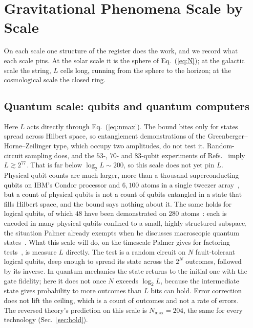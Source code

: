 \documentclass[aps,prd,twocolumn,superscriptaddress,nofootinbib,showkeys]{revtex4-2}
\begin{document}
\section{Gravitational Phenomena Scale by Scale}
\label{sec:scales}

On each scale one structure of the register does the work, and we record what each scale pins. At the solar scale it is the sphere of Eq.~(\ref{eq:N}); at the galactic scale the string, $L$ cells long, running from the sphere to the horizon; at the cosmological scale the closed ring.

\subsection{Quantum scale: qubits and quantum computers}

Here $L$ acts directly through Eq.~(\ref{eq:nmax}). The bound bites only for states spread across Hilbert space, so entanglement demonstrations of the Greenberger--Horne--Zeilinger type, which occupy two amplitudes, do not test it. Random-circuit sampling does, and the $53$-, $70$- and $83$-qubit experiments of Refs.~\cite{arute2019,morvan2024,gao2025} imply $L\gtrsim2^{77}$. That is far below $\log_2L\sim200$, so this scale does not yet pin $L$. Physical qubit counts are much larger, more than a thousand superconducting qubits on IBM's Condor processor and $6{,}100$ atoms in a single tweezer array~\cite{manetsch2025}, but a count of physical qubits is not a count of qubits entangled in a state that fills Hilbert space, and the bound says nothing about it. The same holds for logical qubits, of which $48$ have been demonstrated on $280$ atoms~\cite{bluvstein2024}: each is encoded in many physical qubits confined to a small, highly structured subspace, the situation Palmer already exempts when he discusses macroscopic quantum states~\cite{palmer2026}. What this scale will do, on the timescale Palmer gives for factoring tests~\cite{palmer2026,gidney2025}, is measure $L$ directly. The test is a random circuit on $N$ fault-tolerant logical qubits, deep enough to spread its state across the $2^N$ outcomes, followed by its inverse. In quantum mechanics the state returns to the initial one with the gate fidelity; here it does not once $N$ exceeds $\log_2L$, because the intermediate state gives probability to more outcomes than $L$ bits can hold. Error correction does not lift the ceiling, which is a count of outcomes and not a rate of errors. The reversed theory's prediction on this scale is $N_{\max} = 204$, the same for every technology (Sec.~\ref{sec:hold}).
\end{document}
